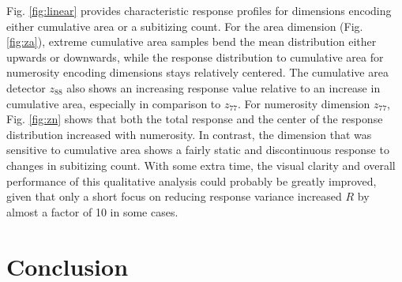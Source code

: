 \documentclass[twocolumn]{article}
\begin{document}
Fig. \ref{fig:linear}  provides characteristic response profiles for dimensions
encoding either cumulative area or a subitizing count. For the area
dimension (Fig. \ref{fig:za}), extreme cumulative area samples bend the mean distribution
either upwards or downwards, while the response distribution to
cumulative area for numerosity encoding dimensions stays relatively
centered. The cumulative area detector \(z_{88}\) also shows an increasing response value relative to an increase in cumulative area, especially in comparison to \(z_{77}\). For numerosity dimension \(z_{77}\), Fig. \ref{fig:zn} shows that both the total response and the center of the response distribution increased with
numerosity. In contrast, the dimension that was sensitive to cumulative area shows a fairly
static and discontinuous response to changes in subitizing count. With some extra time,
the visual clarity and overall performance of this qualitative analysis
could probably be greatly improved, given that only a short focus on
reducing response variance increased \(R\) by almost a factor of 10 in
some cases.

\hypertarget{conclusion}{%
\section{Conclusion}\label{conclusion}}
\end{document}
